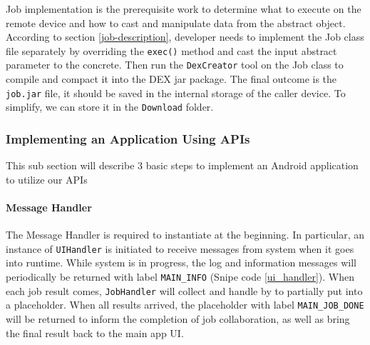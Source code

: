 \documentclass[conference]{IEEEtran}
\begin{document}
Job implementation is the prerequisite work to determine what to execute on the remote device and how to cast and manipulate data from the abstract object. According to section \ref{job-description}, developer needs to implement the Job class file separately by overriding the \texttt{exec()} method and cast the input abstract parameter to the concrete. Then run the \texttt{DexCreator} tool on the Job class to compile and compact it into the DEX jar package. The final outcome is the \texttt{job.jar} file, it should be saved in the internal storage of the caller device. To simplify, we can store it in the \texttt{Download} folder.  

\subsubsection{Implementing an Application Using APIs}

This sub section will describe 3 basic steps to implement an Android application to utilize our APIs

\paragraph{Message Handler}

The Message Handler is required to instantiate at the beginning. In particular, an instance of \texttt{UIHandler} is initiated to receive messages from system when it goes into runtime. While system is in progress, the log and information messages will periodically be returned with label \texttt{MAIN\_INFO} (Snipe code \ref{ui_handler}). When each job result comes, \texttt{JobHandler} will collect and handle by  to partially put into a placeholder. When all results arrived, the placeholder with label \texttt{MAIN\_JOB\_DONE} will be returned to inform the completion of job collaboration, as well as bring the final result back to the main app UI.\\

\noindent {}
\end{document}
